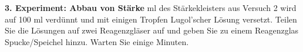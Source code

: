 \documentclass{scrartcl}  %
\begin{document}
\begin{tcolorbox}
				\textbf{3. Experiment: Abbau von Stärke}  ml des Stärkekleisters aus Versuch 2 wird auf 100 ml verdünnt und mit einigen Tropfen Lugol’scher Lösung versetzt. Teilen Sie die Lösungen auf zwei Reagenzgläser auf und geben Sie zu einem Reagenzglas Spucke/Speichel hinzu. Warten Sie einige Minuten.
			\end{tcolorbox}	
\end{document}
